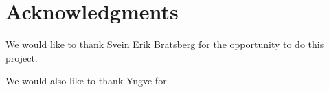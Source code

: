 \clearpage
\section{Acknowledgments}
We would like to thank Svein Erik Bratsberg for the opportunity to do this project.

We would also like to thank Yngve for